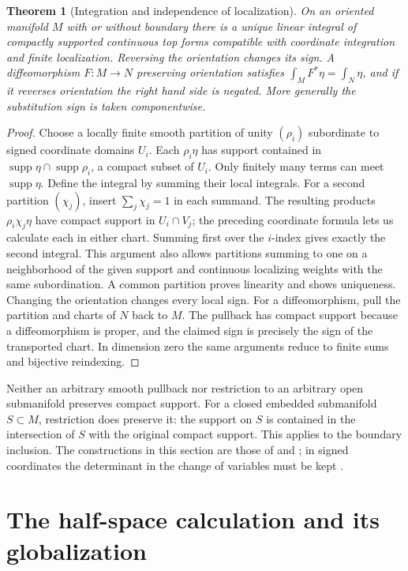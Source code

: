 \documentclass[11pt,oneside,openany]{book}
\newtheorem{theorem}{Theorem}[chapter]
\theoremstyle{definition}
\theoremstyle{remark}
\DeclareMathOperator{\supp}{supp}
\begin{document}
\begin{theorem}[Integration and independence of localization]
\label{p104:M10.02}
On an oriented manifold \(M\) with or without boundary there is a unique
linear integral of compactly supported continuous top forms compatible
with coordinate integration and finite localization. Reversing the
orientation changes its sign. A diffeomorphism \(F:M\to N\) preserving
orientation satisfies \(\int_M F^*\eta=\int_N\eta\), and if it reverses
orientation the right hand side is negated. More generally the
substitution sign is taken componentwise.
\end{theorem}
\begin{proof}
Choose a locally finite smooth partition of unity \((\rho_i)\) subordinate
to signed coordinate domains \(U_i\). Each \(\rho_i\eta\) has support
contained in \(\supp\eta\cap\supp\rho_i\), a compact subset of \(U_i\).
Only finitely many terms can meet \(\supp\eta\). Define the integral by
summing their local integrals. For a second partition \((\chi_j)\),
insert \(\sum_j\chi_j=1\) in each summand. The resulting products
\(\rho_i\chi_j\eta\) have compact support in \(U_i\cap V_j\); the preceding
coordinate formula lets us calculate each in either chart. Summing first
over the \(i\)-index gives exactly the second integral. This argument also
allows partitions summing to one on a neighborhood of the given support
and continuous localizing weights with the same subordination. A common
partition proves linearity and shows uniqueness. Changing the orientation
changes every local sign. For a diffeomorphism, pull the partition and
charts of \(N\) back to \(M\). The pullback has compact support because a
diffeomorphism is proper, and the claimed sign is precisely the sign of
the transported chart. In dimension zero the same arguments reduce to
finite sums and bijective reindexing.
\end{proof}

Neither an arbitrary smooth pullback nor restriction to an arbitrary open
submanifold preserves compact support. For a closed embedded submanifold
\(S\subset M\), restriction does preserve it: the support on \(S\) is
contained in the intersection of \(S\) with the original compact support.
This applies to the boundary inclusion. The constructions in this
section are those of \cite[Chapter 16, pp.~402--410]{lee} and
\cite[\S23.1--23.4]{tu}; in signed coordinates the determinant in the
change of variables must be kept \cite[pp.~266--267]{tuerrata}.

\section{The half-space calculation and its globalization}
\end{document}
